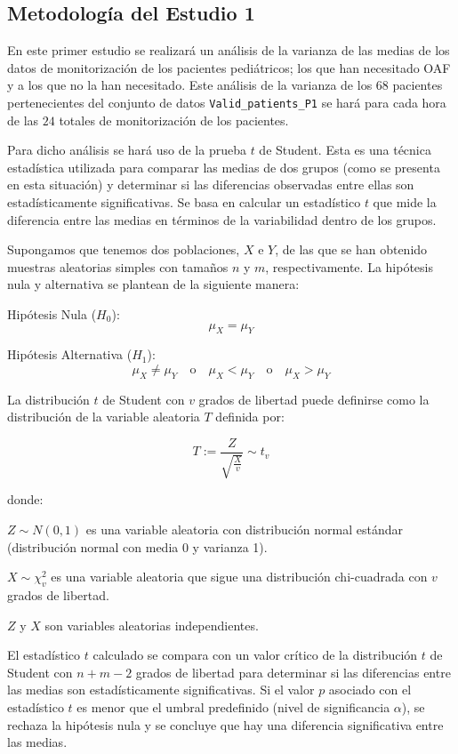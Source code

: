 \subsection{Metodología del Estudio 1}\label{sec:metodologia-estudio-1}

En este primer estudio se realizará un análisis de la varianza de las medias de los datos de monitorización de los pacientes pediátricos; los que han necesitado OAF y a los que no la han necesitado. Este análisis de la varianza de los $68$ pacientes pertenecientes del conjunto de datos \texttt{Valid\_patients\_P1} se hará para cada hora de las $24$ totales de monitorización de los pacientes.

Para dicho análisis se hará uso de la prueba $t$ de Student. Esta es una técnica estadística utilizada para comparar las medias de dos grupos (como se presenta en esta situación) y determinar si las diferencias observadas entre ellas son estadísticamente significativas. Se basa en calcular un estadístico $t$ que mide la diferencia entre las medias en términos de la variabilidad dentro de los grupos.

Supongamos que tenemos dos poblaciones, $X$ e $Y$, de las que se han obtenido muestras aleatorias simples con tamaños $n$ y $m$, respectivamente. La hipótesis nula y alternativa se plantean de la siguiente manera:

Hipótesis Nula ($H_0$):
\[
\mu_X = \mu_Y
\]

Hipótesis Alternativa ($H_1$):
\[
\mu_X \neq \mu_Y \quad \text{o} \quad \mu_X < \mu_Y \quad \text{o} \quad \mu_X > \mu_Y
\]

La distribución \( t \) de Student con \( v \) grados de libertad puede definirse como la distribución de la variable aleatoria \( T \) definida por:

\[ T := \frac{Z}{\sqrt{\frac{X}{v}}} \sim t_v \]

donde:

\( Z \sim N(0,1) \) es una variable aleatoria con distribución normal estándar (distribución normal con media 0 y varianza 1).

\( X \sim \chi_{v}^{2} \) es una variable aleatoria que sigue una distribución chi-cuadrada con \( v \) grados de libertad.

\( Z \) y \( X \) son variables aleatorias independientes.

El estadístico \( t \) calculado se compara con un valor crítico de la distribución \( t \) de Student con \( n+m-2 \) grados de libertad para determinar si las diferencias entre las medias son estadísticamente significativas. Si el valor \( p \) asociado con el estadístico \( t \) es menor que el umbral predefinido (nivel de significancia \( \alpha \)), se rechaza la hipótesis nula y se concluye que hay una diferencia significativa entre las medias.


